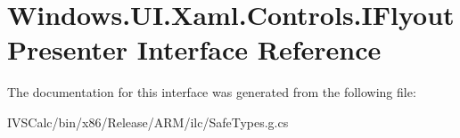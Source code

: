 \hypertarget{interface_windows_1_1_u_i_1_1_xaml_1_1_controls_1_1_i_flyout_presenter}{}\section{Windows.\+U\+I.\+Xaml.\+Controls.\+I\+Flyout\+Presenter Interface Reference}
\label{interface_windows_1_1_u_i_1_1_xaml_1_1_controls_1_1_i_flyout_presenter}


The documentation for this interface was generated from the following file\+:\begin{DoxyCompactItemize}
\item 
I\+V\+S\+Calc/bin/x86/\+Release/\+A\+R\+M/ilc/Safe\+Types.\+g.\+cs\end{DoxyCompactItemize}
